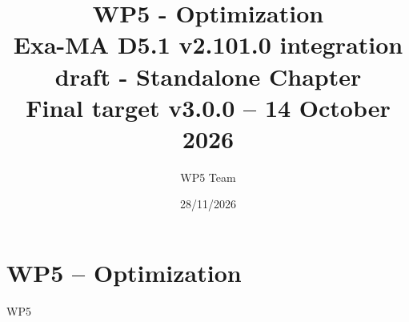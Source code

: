 \documentclass[11pt]{report}
\begin{document}
\title{WP5 - Optimization\\
\large Exa-MA D5.1 v2.101.0 integration draft - Standalone Chapter\\
\normalsize Final target v3.0.0 -- 14 October 2026}
\author{WP5 Team}
\date{28/11/2026}
\maketitle

\tableofcontents
\clearpage

\chapter{WP5 -- Optimization}
\label{chap:wp5}
{WP5}
\clearpage


\end{document}
